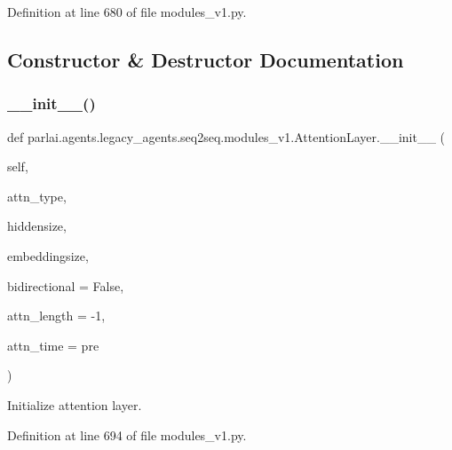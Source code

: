 Definition at line 680 of file modules\+\_\+v1.\+py.



\subsection{Constructor \& Destructor Documentation}
\mbox{\label{classparlai_1_1agents_1_1legacy__agents_1_1seq2seq_1_1modules__v1_1_1AttentionLayer_aed77232760e470a547c8c4ec68e529c7}} 
\subsubsection{\texorpdfstring{\+\_\+\+\_\+init\+\_\+\+\_\+()}{\_\_init\_\_()}}
{\footnotesize\ttfamily def parlai.\+agents.\+legacy\+\_\+agents.\+seq2seq.\+modules\+\_\+v1.\+Attention\+Layer.\+\_\+\+\_\+init\+\_\+\+\_\+ (\begin{DoxyParamCaption}\item[{}]{self,  }\item[{}]{attn\+\_\+type,  }\item[{}]{hiddensize,  }\item[{}]{embeddingsize,  }\item[{}]{bidirectional = {\ttfamily False},  }\item[{}]{attn\+\_\+length = {\ttfamily -\/1},  }\item[{}]{attn\+\_\+time = {\ttfamily \textquotesingle{}pre\textquotesingle{}} }\end{DoxyParamCaption})}

\begin{DoxyVerb}Initialize attention layer.\end{DoxyVerb}
 

Definition at line 694 of file modules\+\_\+v1.\+py.



